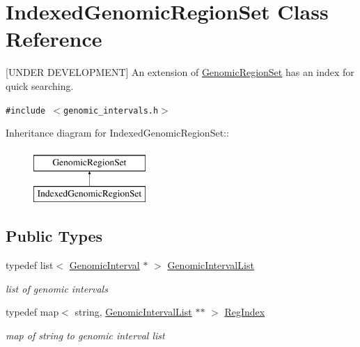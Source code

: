 \hypertarget{classIndexedGenomicRegionSet}{
\section{IndexedGenomicRegionSet Class Reference}
\label{classIndexedGenomicRegionSet}
}
\mbox{[}UNDER DEVELOPMENT\mbox{]} An extension of \hyperlink{classGenomicRegionSet}{GenomicRegionSet} has an index for quick searching.  


{\tt \#include $<$genomic\_\-intervals.h$>$}

Inheritance diagram for IndexedGenomicRegionSet::\begin{figure}[H]
\begin{center}
\leavevmode
\includegraphics[height=2cm]{classIndexedGenomicRegionSet}
\end{center}
\end{figure}
\subsection*{Public Types}
\begin{CompactItemize}
\item 
\hypertarget{classIndexedGenomicRegionSet_870fa974397cb4487b5e2fe3fa6f8ec5}{
typedef list$<$ \hyperlink{classGenomicInterval}{GenomicInterval} $\ast$ $>$ \hyperlink{classIndexedGenomicRegionSet_870fa974397cb4487b5e2fe3fa6f8ec5}{GenomicIntervalList}}
\label{classIndexedGenomicRegionSet_870fa974397cb4487b5e2fe3fa6f8ec5}

\begin{CompactList}\small\item\em list of genomic intervals \item\end{CompactList}\item 
\hypertarget{classIndexedGenomicRegionSet_c1e7aa6c1a55659c5756a70d0289c997}{
typedef map$<$ string, \hyperlink{classIndexedGenomicRegionSet_870fa974397cb4487b5e2fe3fa6f8ec5}{GenomicIntervalList} $\ast$$\ast$ $>$ \hyperlink{classIndexedGenomicRegionSet_c1e7aa6c1a55659c5756a70d0289c997}{RegIndex}}
\label{classIndexedGenomicRegionSet_c1e7aa6c1a55659c5756a70d0289c997}

\begin{CompactList}\small\item\em map of string to genomic interval list \item\end{CompactList}\end{CompactItemize}
